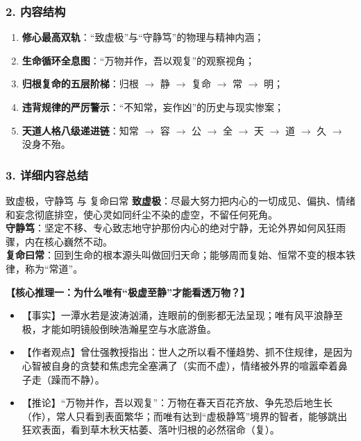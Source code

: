 \subsubsection{2. 内容结构}
\begin{enumerate}
    \item \textbf{修心最高双轨}：“致虚极”与“守静笃”的物理与精神内涵；
    \item \textbf{生命循环全息图}：“万物并作，吾以观复”的观察视角；
    \item \textbf{归根复命的五层阶梯}：归根 $\rightarrow$ 静 $\rightarrow$ 复命 $\rightarrow$ 常 $\rightarrow$ 明；
    \item \textbf{违背规律的严厉警示}：“不知常，妄作凶”的历史与现实惨案；
    \item \textbf{天道人格八级递进链}：知常 $\rightarrow$ 容 $\rightarrow$ 公 $\rightarrow$ 全 $\rightarrow$ 天 $\rightarrow$ 道 $\rightarrow$ 久 $\rightarrow$ 没身不殆。
\end{enumerate}

\subsubsection{3. 详细内容总结}

\begin{ConceptBox}{致虚极，守静笃 与 复命曰常}
\textbf{致虚极}：尽最大努力把内心的一切成见、偏执、情绪和妄念彻底排空，使心灵如同纤尘不染的虚空，不留任何死角。\\
\textbf{守静笃}：坚定不移、专心致志地守护那份内心的绝对宁静，无论外界如何风狂雨骤，内在核心巍然不动。\\
\textbf{复命曰常}：回到生命的根本源头叫做回归天命；能够周而复始、恒常不变的根本铁律，称为“常道”。
\end{ConceptBox}

\noindent\textbf{【核心推理一：为什么唯有“极虚至静”才能看透万物？】}
\begin{itemize}
    \item 【事实】一潭水若是波涛汹涌，连眼前的倒影都无法呈现；唯有风平浪静至极，才能如明镜般倒映浩瀚星空与水底游鱼。
    \item 【作者观点】曾仕强教授指出：世人之所以看不懂趋势、抓不住规律，是因为心智被自身的贪婪和焦虑完全塞满了（实而不虚），情绪被外界的喧嚣牵着鼻子走（躁而不静）。
    \item 【推论】“万物并作，吾以观复”：万物在春天百花齐放、争先恐后地生长（作），常人只看到表面繁华；而唯有达到“虚极静笃”境界的智者，能够跳出狂欢表面，看到草木秋天枯萎、落叶归根的必然宿命（复）。
\end{itemize}

